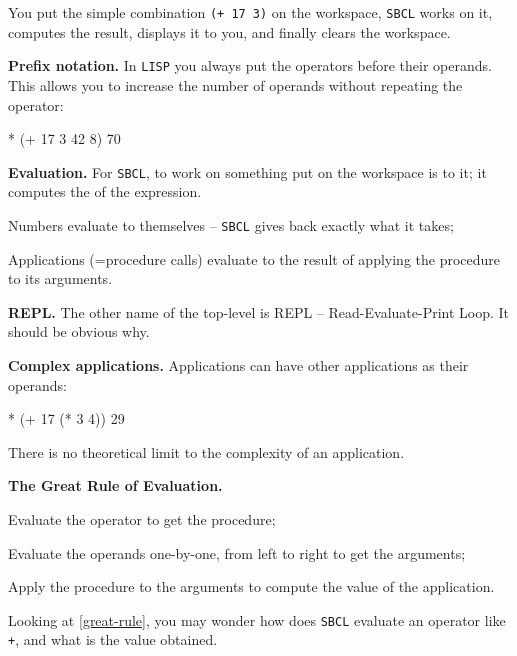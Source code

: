 \documentclass[a4paper,11pt]{article}
\begin{document}
\begin{uenum}
You put the simple combination \Verb-(+ 17 3)- on the workspace, \Verb+SBCL+ works on it, computes the result, displays it to you, and finally clears the workspace.

\item {\bf Prefix notation.} In \Verb+LISP+ you always put the operators before their operands. This allows you to increase the number of operands without repeating the operator: 

\begin{lispcode}
* (+ 17 3 42 8)
70
\end{lispcode}

\item {\bf Evaluation.} For \Verb+SBCL+, to work on something put on the workspace is to  it; it computes the  of the expression.    

\begin{uenumi}
\item Numbers evaluate to themselves -- \Verb+SBCL+ gives back exactly what it takes;
\item Applications (=procedure calls) evaluate to the result of applying the procedure to its arguments.
\end{uenumi}

\item {\bf REPL.} The other name of the top-level is REPL -- Read-Evaluate-Print Loop. It should be obvious why.   

\item {\bf Complex applications.} Applications can have other applications as their operands:
\label{complex-app}
\begin{lispcode}
* (+ 17 (* 3 4))
29
\end{lispcode}

There is no theoretical limit to the complexity of an application.

\item {\bf The Great Rule of Evaluation.} 
\label{great-rule}
\begin{uenumi}
\item Evaluate the operator to get the procedure;
\item Evaluate the operands one-by-one, from left to right to get the arguments;
\item Apply the procedure to the arguments to compute the value of the application.
\end{uenumi}

\item Looking at \ref{great-rule}, you may wonder how does \Verb+SBCL+ evaluate an operator like \Verb-+-, and what is the value obtained.


\end{uenum}
\end{document}
